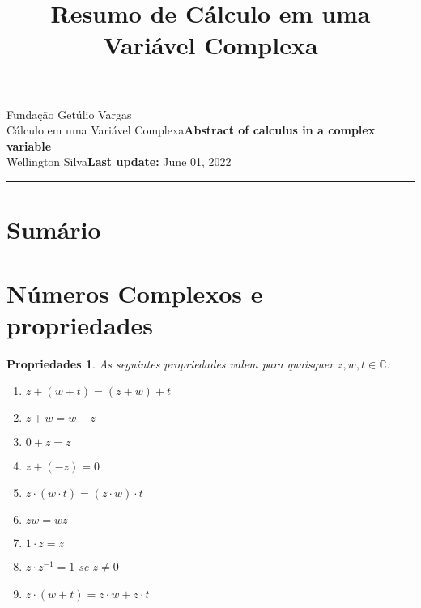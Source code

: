 \documentclass{article}
\title{Resumo de Cálculo em uma Variável Complexa}
\author{}
\date{}
\newtheorem{prop}{Propriedades}
\newcommand{\assignment}{Abstract of calculus in a complex variable}
\newcommand{\duedate}{June 01, 2022}
\begin{document}
Fundação Getúlio Vargas\hfill\\
Cálculo em uma Variável Complexa\hfill\textbf{\assignment}\\
Wellington Silva\hfill\textbf{Last update:} \duedate\\
\smallskip\hrule\bigskip

{\let\newpage\relax\maketitle}

\section*{Sumário}

\textbf{}
\vspace{4.0mm}

\textbf{}
\vspace{4.0mm}

\textbf{}
\vspace{4.0mm}

\textbf{}
\vspace{4.0mm}

\textbf{}
\vspace{4.0mm}

\textbf{}
\vspace{4.0mm}

\textbf{}
\vspace{4.0mm}

\textbf{}
\vspace{4.0mm}

\textbf{}
\vspace{4.0mm}

\textbf{}
\vspace{4.0mm}

\newpage

\section*{Números Complexos e propriedades}
\label{s1}

\begin{prop} As seguintes propriedades valem para quaisquer $z, w, t \in \mathbb{C}$:

\begin{enumerate}[label=(\alph*)]
    \item $z + (w + t) = (z + w) + t$
    \item $z + w = w + z$
    \item $0 + z = z$
    \item $z + (-z) = 0$
    \item $z \cdot (w \cdot t) = (z \cdot w) \cdot t$
    \item $zw = wz$
    \item $1 \cdot z = z$
    \item $z \cdot z^{-1} = 1$ se $z \neq 0$
    \item $z \cdot (w + t) = z \cdot w + z \cdot t$
\end{enumerate}
\end{prop}
\end{document}
